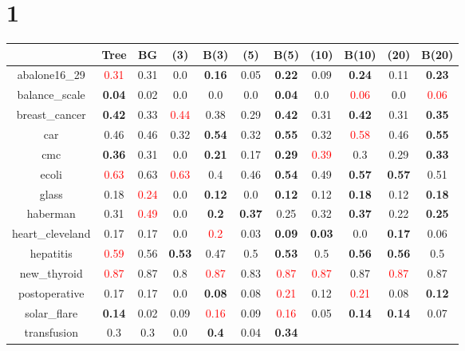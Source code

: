 \documentclass{article}%
\begin{document}
\section*{1}%
\begin{tabular}{c|cccccccccc}%
\hline%
&Tree&BG&(3)&B(3)&(5)&B(5)&(10)&B(10)&(20)&B(20)\\%
\hline%
abalone16\_29&\textcolor{red}{ 
0.31
}&0.31&0.0&\textbf{0.16}&0.05&\textbf{0.22}&0.09&\textbf{0.24}&0.11&\textbf{0.23}\\%
\hline%
balance\_scale&\textbf{0.04}&0.02&0.0&0.0&0.0&\textbf{0.04}&0.0&\textcolor{red}{ 
0.06
}&0.0&\textcolor{red}{ 
0.06
}\\%
\hline%
breast\_cancer&\textbf{0.42}&0.33&\textcolor{red}{ 
0.44
}&0.38&0.29&\textbf{0.42}&0.31&\textbf{0.42}&0.31&\textbf{0.35}\\%
\hline%
car&0.46&0.46&0.32&\textbf{0.54}&0.32&\textbf{0.55}&0.32&\textcolor{red}{ 
0.58
}&0.46&\textbf{0.55}\\%
\hline%
cmc&\textbf{0.36}&0.31&0.0&\textbf{0.21}&0.17&\textbf{0.29}&\textcolor{red}{ 
0.39
}&0.3&0.29&\textbf{0.33}\\%
\hline%
ecoli&\textcolor{red}{ 
0.63
}&0.63&\textcolor{red}{ 
0.63
}&0.4&0.46&\textbf{0.54}&0.49&\textbf{0.57}&\textbf{0.57}&0.51\\%
\hline%
glass&0.18&\textcolor{red}{ 
0.24
}&0.0&\textbf{0.12}&0.0&\textbf{0.12}&0.12&\textbf{0.18}&0.12&\textbf{0.18}\\%
\hline%
haberman&0.31&\textcolor{red}{ 
0.49
}&0.0&\textbf{0.2}&\textbf{0.37}&0.25&0.32&\textbf{0.37}&0.22&\textbf{0.25}\\%
\hline%
heart\_cleveland&0.17&0.17&0.0&\textcolor{red}{ 
0.2
}&0.03&\textbf{0.09}&\textbf{0.03}&0.0&\textbf{0.17}&0.06\\%
\hline%
hepatitis&\textcolor{red}{ 
0.59
}&0.56&\textbf{0.53}&0.47&0.5&\textbf{0.53}&0.5&\textbf{0.56}&\textbf{0.56}&0.5\\%
\hline%
new\_thyroid&\textcolor{red}{ 
0.87
}&0.87&0.8&\textcolor{red}{ 
0.87
}&0.83&\textcolor{red}{ 
0.87
}&\textcolor{red}{ 
0.87
}&0.87&\textcolor{red}{ 
0.87
}&0.87\\%
\hline%
postoperative&0.17&0.17&0.0&\textbf{0.08}&0.08&\textcolor{red}{ 
0.21
}&0.12&\textcolor{red}{ 
0.21
}&0.08&\textbf{0.12}\\%
\hline%
solar\_flare&\textbf{0.14}&0.02&0.09&\textcolor{red}{ 
0.16
}&0.09&\textcolor{red}{ 
0.16
}&0.05&\textbf{0.14}&\textbf{0.14}&0.07\\%
\hline%
transfusion&0.3&0.3&0.0&\textbf{0.4}&0.04&\textbf{0.34}&\textcolor{red}{ 
}
\end{tabular}
\end{document}
